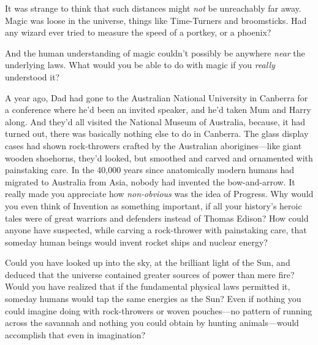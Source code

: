 It was strange to think that such distances might \emph{not} be unreachably far 
away. Magic was loose in the universe, things like Time-Turners and 
broomsticks. Had any wizard ever tried to measure the speed of a portkey, or a 
phoenix?

And the human understanding of magic couldn't possibly be anywhere \emph{near} 
the underlying laws. What would you be able to do with magic if you 
\emph{really} understood it?

A year ago, Dad had gone to the Australian National University in Canberra for 
a conference where he'd been an invited speaker, and he'd taken Mum and Harry 
along. And they'd all visited the National Museum of Australia, because, it had 
turned out, there was basically nothing else to do in Canberra. The glass 
display cases had shown rock-throwers crafted by the Australian 
aborigines---like giant wooden shoehorns, they'd looked, but smoothed and 
carved and ornamented with painstaking care. In the 40,000 years since 
anatomically modern humans had migrated to Australia from Asia, nobody had 
invented the bow-and-arrow. It really made you appreciate how 
\emph{non-obvious} was the idea of Progress. Why would you even think of 
Invention as something important, if all your history's heroic tales were of 
great warriors and defenders instead of Thomas Edison? How could anyone have 
suspected, while carving a rock-thrower with painstaking care, that someday 
human beings would invent rocket ships and nuclear energy?

Could you have looked up into the sky, at the brilliant light of the Sun, and 
deduced that the universe contained greater sources of power than mere fire? 
Would you have realized that if the fundamental physical laws permitted it, 
someday humans would tap the same energies as the Sun? Even if nothing you 
could imagine doing with rock-throwers or woven pouches---no pattern of running 
across the savannah and nothing you could obtain by hunting animals---would 
accomplish that even in imagination?

